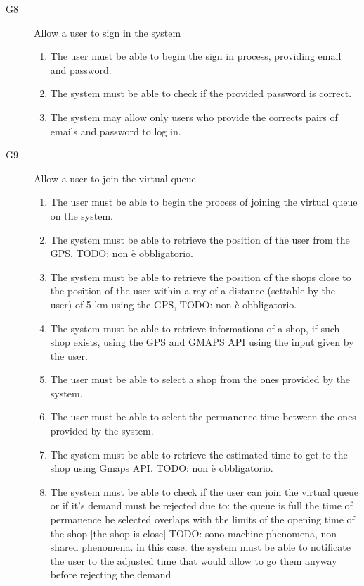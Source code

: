 \begin{description}
\begin{enumerate}[resume*]
        \end{enumerate}
    \item [G8] Allow a user to sign in the system
        \begin{enumerate}[resume*]
            \item The user must be able to begin the sign in process, providing email and password.
            \item The system must be able to check if the provided password is correct.
            \item The system may allow only users who provide the corrects pairs of emails and password to log in.
        \end{enumerate}
    \item [G9] Allow a user to join the virtual queue
        \begin{enumerate}[resume*]
            \item The user must be able to begin the process of joining the virtual queue on the system.
            \item The system must be able to retrieve the position of the user from the GPS. TODO: non è obbligatorio.
            \item The system must be able to retrieve the position of the shops close to the position of the user within a ray of a distance (settable by the user) of 5 km using the GPS, TODO: non è obbligatorio.
            \item The system must be able to retrieve informations of a shop, if such shop exists, using the GPS and GMAPS API using the input given by the user.
            \item The user must be able to select a shop from the ones provided by the system.
            \item The user must be able to select the permanence time between the ones provided by the system.
            \item The system must be able to retrieve the estimated time to get to the shop using Gmaps API. TODO: non è obbligatorio.
            \item The system must be able to check if the user can join the virtual queue or if it’s demand must be rejected due to:
                               the queue is full
                               the time of permanence he selected overlaps with the limits of the opening time of the shop [the shop is close]
                               TODO: sono machine phenomena, non shared phenomena.
            in this case, the system must be able to notificate the user to the adjusted time that would allow to go them anyway before rejecting the demand

\end{enumerate}
\end{description}
